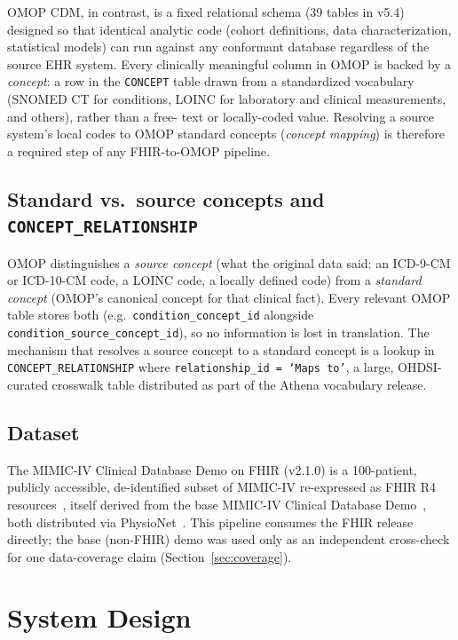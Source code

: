 \documentclass[11pt]{article}
\begin{document}
OMOP CDM, in contrast, is a fixed relational schema (39 tables in v5.4)
designed so that identical analytic code (cohort definitions, data
characterization, statistical models) can run against any conformant
database regardless of the source EHR system. Every clinically meaningful
column in OMOP is backed by a \emph{concept}: a row in the \texttt{CONCEPT}
table drawn from a standardized vocabulary (SNOMED CT for conditions, LOINC
for laboratory and clinical measurements, and others), rather than a free-
text or locally-coded value. Resolving a source system's local codes to
OMOP standard concepts (\emph{concept mapping}) is therefore a
required step of any FHIR-to-OMOP pipeline.

\subsection{Standard vs.\ source concepts and \texttt{CONCEPT\_RELATIONSHIP}}

OMOP distinguishes a \emph{source concept} (what the original data said:
an ICD-9-CM or ICD-10-CM code, a LOINC code, a locally defined code) from a
\emph{standard concept} (OMOP's canonical concept for that clinical fact).
Every relevant OMOP table stores both (e.g.\ \texttt{condition\_concept\_id}
alongside \texttt{condition\_source\_concept\_id}), so no information is
lost in translation. The mechanism that resolves a source concept to a
standard concept is a lookup in \texttt{CONCEPT\_RELATIONSHIP} where
\texttt{relationship\_id = `Maps to'}, a large, OHDSI-curated crosswalk
table distributed as part of the Athena vocabulary release.

\subsection{Dataset}

The MIMIC-IV Clinical Database Demo on FHIR (v2.1.0) is a 100-patient,
publicly accessible, de-identified subset of MIMIC-IV re-expressed as FHIR
R4 resources~\cite{bennett2023mimicfhir, bennett2025physionet}, itself
derived from the base MIMIC-IV Clinical Database
Demo~\cite{johnson2023mimiciv}, both distributed via
PhysioNet~\cite{goldberger2000physionet}. This pipeline consumes the FHIR
release directly; the base (non-FHIR) demo was used only as an independent
cross-check for one data-coverage claim (Section~\ref{sec:coverage}).

\section{System Design}
\end{document}
